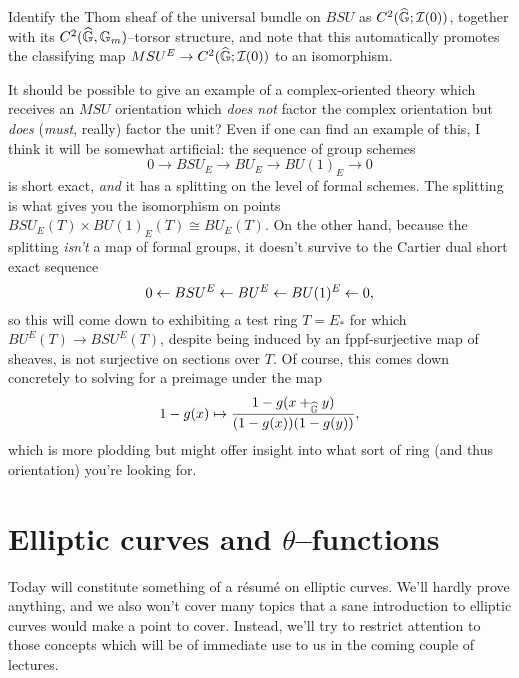 Identify the Thom sheaf of the universal bundle on $BSU$ as $C^2(\widehat{\mathbb G}; \mathcal{I}(0))$, together with its $C^2(\widehat{\mathbb G}, \mathbb G_m)$--torsor structure, and note that this automatically promotes the classifying map $MSU^E \to C^2(\widehat{\mathbb G}; \mathcal{I}(0))$ to an isomorphism. 

\begin{remark}
It should be possible to give an example of a complex-oriented theory which receives an $MSU$ orientation which \emph{does not} factor the complex orientation but \emph{does} (\emph{must}, really) factor the unit?  Even if one can find an example of this, I think it will be somewhat artificial: the sequence of group schemes \[0 \to BSU_E \to BU_E \to BU(1)_E \to 0\] is short exact, \emph{and} it has a splitting on the level of formal schemes.  The splitting is what gives you the isomorphism on points $BSU_E(T) \times BU(1)_E(T) \cong BU_E(T)$.  On the other hand, because the splitting \emph{isn't} a map of formal groups, it doesn't survive to the Cartier dual short exact sequence \[0 \leftarrow BSU^E \leftarrow BU^E \leftarrow BU(1)^E \leftarrow 0,\] so this will come down to exhibiting a test ring $T = E_*$ for which $BU^E(T) \to BSU^E(T)$, despite being induced by an fppf-surjective map of sheaves, is not surjective on sections over $T$.  Of course, this comes down concretely to solving for a preimage under the map \[1 - g(x) \mapsto \frac{1 - g(x +_{\widehat{\mathbb G}} y)}{(1 - g(x))(1 - g(y))},\] which is more plodding but might offer insight into what sort of ring (and thus orientation) you're looking for.
\end{remark}










\section{Elliptic curves and $\theta$--functions}


Today will constitute something of a r\'esum\'e on elliptic curves.  We'll hardly prove anything, and we also won't cover many topics that a sane introduction to elliptic curves would make a point to cover.  Instead, we'll try to restrict attention to those concepts which will be of immediate use to us in the coming couple of lectures.

